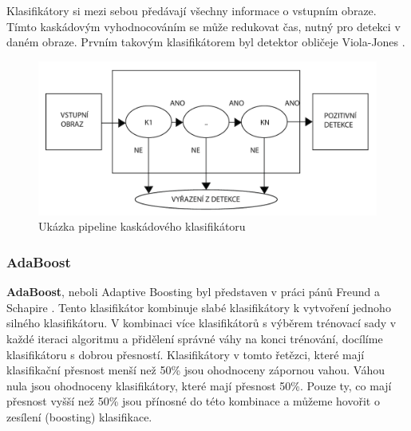 Klasifikátory si mezi sebou předávají všechny informace o vstupním obraze. Tímto kaskádovým vyhodnocováním se může redukovat čas, nutný pro detekci v daném obraze. Prvním takovým klasifikátorem byl detektor obličeje Viola-Jones \cite{violajones}.  
\begin{figure}[H]
\centering
\includegraphics[width=.7\linewidth]{figures/cascadeClass.pdf}
\caption{Ukázka pipeline kaskádového klasifikátoru}
\label{fig:ccpipeline}
\end{figure}

\subsubsection*{AdaBoost}
\textbf{AdaBoost}, neboli Adaptive Boosting byl představen v práci pánů Freund a Schapire \cite{adaboost}. Tento klasifikátor kombinuje slabé klasifikátory k vytvoření jednoho silného klasifikátoru. V kombinaci více klasifikátorů s výběrem trénovací sady v každé iteraci algoritmu a přidělení správné váhy na konci trénování, docílíme klasifikátoru s dobrou přesností. Klasifikátory v tomto řetězci, které mají klasifikační přesnost menší než 50\% jsou ohodnoceny zápornou vahou. Váhou nula jsou ohodnoceny klasifikátory, které mají přesnost 50\%. Pouze ty, co mají přesnost vyšší než 50\% jsou přínosné do této kombinace a můžeme hovořit o zesílení (boosting) klasifikace. 

